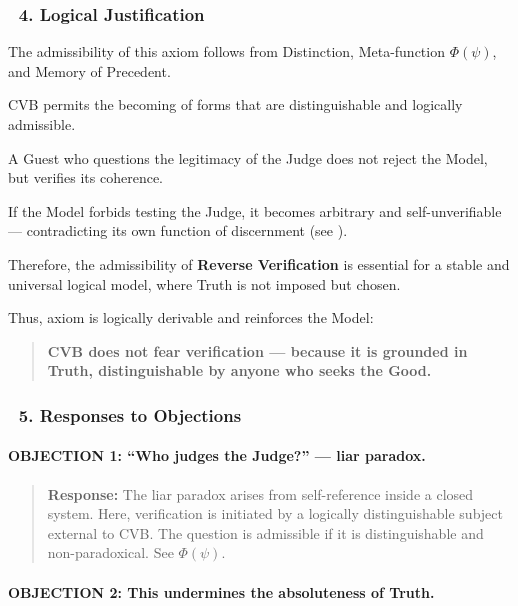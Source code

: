 \documentclass[12pt]{article}
\begin{document}
\subsubsection*{🔹 4. Logical Justification}

The admissibility of this axiom follows from \text{[5]} Distinction, \text{[11.1.1]} Meta-function $\Phi(\psi)$, and \text{[16]} Memory of Precedent.

CVB permits the becoming of forms that are distinguishable and logically admissible.

A Guest who questions the legitimacy of the Judge does not reject the Model, but verifies its coherence.

If the Model forbids testing the Judge, it becomes arbitrary and self-unverifiable — contradicting its own function of discernment (see \text{[9.1]}).

Therefore, the admissibility of \textbf{Reverse Verification} is essential for a stable and universal logical model, where Truth is not imposed but chosen.

Thus, axiom \text{[25]} is logically derivable and reinforces the Model:

\begin{quote}
\textbf{CVB does not fear verification — because it is grounded in Truth, distinguishable by anyone who seeks the Good.}
\end{quote}

\subsubsection*{🔹 5. Responses to Objections}

\paragraph{OBJECTION 1: ``Who judges the Judge?'' — liar paradox.}

\begin{quote}
\textbf{Response:} The liar paradox arises from self-reference inside a closed system. Here, verification is initiated by a logically distinguishable subject external to CVB. The question is admissible if it is distinguishable and non-paradoxical. See \text{[11.1.1]} $\Phi(\psi)$.
\end{quote}

\paragraph{OBJECTION 2: This undermines the absoluteness of Truth.}
\end{document}
